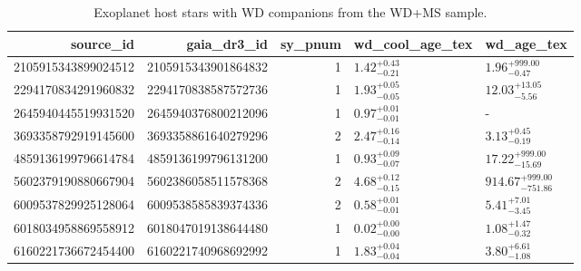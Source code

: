 \begin{table}
\caption{Exoplanet host stars with WD companions from the WD+MS sample.}
\label{tab:exoplanets}
\begin{tabular}{rrrll}
\toprule
source_id & gaia_dr3_id & sy_pnum & wd_cool_age_tex & wd_age_tex \\
\midrule
2105915343899024512 & 2105915343901864832 & 1 & $1.42^{+0.43}_{-0.21}$ & $1.96^{+999.00}_{-0.47}$ \\
2294170834291960832 & 2294170838587572736 & 1 & $1.93^{+0.05}_{-0.05}$ & $12.03^{+13.05}_{-5.56}$ \\
2645940445519931520 & 2645940376800212096 & 1 & $0.97^{+0.01}_{-0.01}$ & - \\
3693358792919145600 & 3693358861640279296 & 2 & $2.47^{+0.16}_{-0.14}$ & $3.13^{+0.45}_{-0.19}$ \\
4859136199796614784 & 4859136199796131200 & 1 & $0.93^{+0.09}_{-0.07}$ & $17.22^{+999.00}_{-15.69}$ \\
5602379190880667904 & 5602386058511578368 & 2 & $4.68^{+0.12}_{-0.15}$ & $914.67^{+999.00}_{-751.86}$ \\
6009537829925128064 & 6009538585839374336 & 2 & $0.58^{+0.01}_{-0.01}$ & $5.41^{+7.01}_{-3.45}$ \\
6018034958869558912 & 6018047019138644480 & 1 & $0.02^{+0.00}_{-0.00}$ & $1.08^{+1.47}_{-0.32}$ \\
6160221736672454400 & 6160221740968692992 & 1 & $1.83^{+0.04}_{-0.04}$ & $3.80^{+6.61}_{-1.08}$ \\
\bottomrule
\end{tabular}
\end{table}
